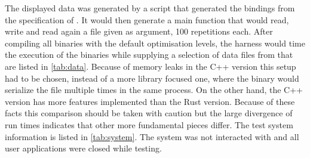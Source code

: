 \documentclass[thesis]{subfiles}
\begin{document}
  The displayed data was generated by a script that generated the bindings from the specification of \autocite{skill-llvm}.
  It would then generate a main function that would read, write and read again a file given as argument, 100 repetitions each.
  After compiling all binaries with the default optimisation levels, the harness would time the execution of the binaries while supplying a selection of data files from \autocite{skill-llvm} that are listed in \autoref{tab:data}.
  Because of memory leaks in the C++ version this setup had to be chosen, instead of a more library focused one, where the binary would serialize the file multiple times in the same process.
  On the other hand, the C++ version has more features implemented than the Rust version.
  Because of these facts this comparison should be taken with caution but the large divergence of run times indicates that other more fundamental pieces differ.
  The test system information is listed in \autoref{tab:system}.
  The system was not interacted with and all user applications were closed while testing.
\end{document}
